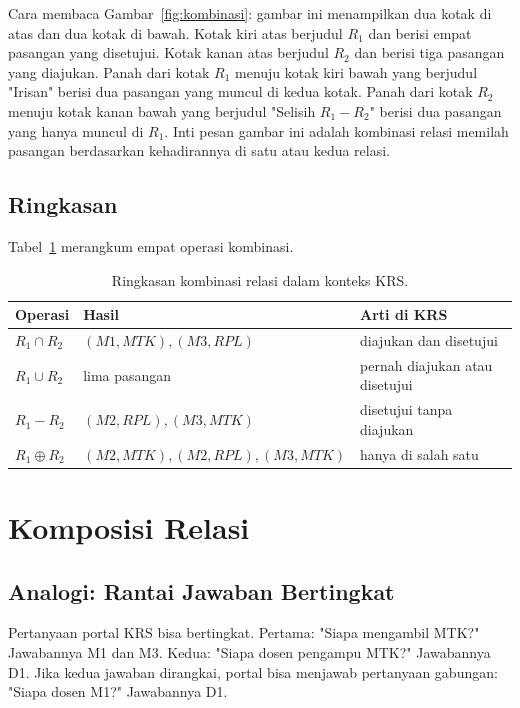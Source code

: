 \documentclass[11pt,a4paper]{article}
\begin{document}
Cara membaca Gambar~\ref{fig:kombinasi}: gambar ini menampilkan dua kotak di atas dan dua kotak di bawah. Kotak kiri atas berjudul $R_1$ dan berisi empat pasangan yang disetujui. Kotak kanan atas berjudul $R_2$ dan berisi tiga pasangan yang diajukan. Panah dari kotak $R_1$ menuju kotak kiri bawah yang berjudul "Irisan" berisi dua pasangan yang muncul di kedua kotak. Panah dari kotak $R_2$ menuju kotak kanan bawah yang berjudul "Selisih $R_1-R_2$" berisi dua pasangan yang hanya muncul di $R_1$. Inti pesan gambar ini adalah kombinasi relasi memilah pasangan berdasarkan kehadirannya di satu atau kedua relasi.

\subsection{Ringkasan}

Tabel~\ref{tab:kombinasi} merangkum empat operasi kombinasi.

\begin{table}[H]
	\centering
	\caption{Ringkasan kombinasi relasi dalam konteks KRS.}
	\label{tab:kombinasi}
	\small
	\begin{tabularx}{\textwidth}{l X X}
		\toprule
		Operasi          & Hasil                        & Arti di KRS                    \\
		\midrule
		$R_1 \cap R_2$   & $(M1,MTK),(M3,RPL)$          & diajukan dan disetujui         \\
		$R_1 \cup R_2$   & lima pasangan                & pernah diajukan atau disetujui \\
		$R_1-R_2$        & $(M2,RPL),(M3,MTK)$          & disetujui tanpa diajukan       \\
		$R_1 \oplus R_2$ & $(M2,MTK),(M2,RPL),(M3,MTK)$ & hanya di salah satu            \\
		\bottomrule
	\end{tabularx}
\end{table}

\section{Komposisi Relasi}

\subsection{Analogi: Rantai Jawaban Bertingkat}

Pertanyaan portal KRS bisa bertingkat. Pertama: "Siapa mengambil MTK?" Jawabannya M1 dan M3. Kedua: "Siapa dosen pengampu MTK?" Jawabannya D1. Jika kedua jawaban dirangkai, portal bisa menjawab pertanyaan gabungan: "Siapa dosen M1?" Jawabannya D1.
\end{document}
